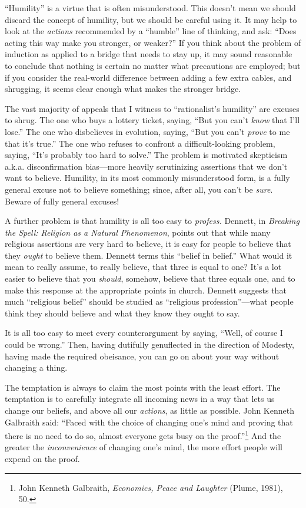 {
 ``Humility'' is a virtue that
is often misunderstood. This doesn't mean we should
discard the concept of humility, but we should be careful using it. It
may help to look at the \textit{actions} recommended by a
``humble'' line of thinking, and
ask: ``Does acting this way make you stronger, or
weaker?'' If you think about the problem of induction
as applied to a bridge that needs to stay up, it may sound reasonable
to conclude that nothing is certain no matter what precautions are
employed; but if you consider the real-world difference between adding
a few extra cables, and shrugging, it seems clear enough what makes the
stronger bridge.}

{
 The vast majority of appeals that I witness to
``rationalist's
humility'' are excuses to shrug. The one who buys a
lottery ticket, saying, ``But you
can't \textit{know} that I'll
lose.'' The one who disbelieves in evolution, saying,
``But you can't \textit{prove} to me
that it's true.'' The one who refuses
to confront a difficult-looking problem, saying,
``It's probably too hard to
solve.'' The problem is motivated skepticism a.k.a.
disconfirmation bias---more heavily scrutinizing assertions that we
don't want to believe. Humility, in its most commonly
misunderstood form, is a fully general excuse not to believe something;
since, after all, you can't be \textit{sure}. Beware of
fully general excuses!}

{
 A further problem is that humility is all too easy to
\textit{profess.} Dennett, in \textit{Breaking the Spell: Religion as a
Natural Phenomenon}, points out that while many religious assertions
are very hard to believe, it is easy for people to believe that they
\textit{ought} to believe them. Dennett terms this
``belief in belief.'' What would it
mean to really assume, to really believe, that three is equal to one?
It's a lot easier to believe that you \textit{should},
somehow, believe that three equals one, and to make this response at
the appropriate points in church. Dennett suggests that much
``religious belief'' should be
studied as ``religious
profession''---what people think they should believe
and what they know they ought to say.}

{
 It is all too easy to meet every counterargument by saying,
``Well, of course I could be
wrong.'' Then, having dutifully genuflected in the
direction of Modesty, having made the required obeisance, you can go on
about your way without changing a thing.}

{
 The temptation is always to claim the most points with the least
effort. The temptation is to carefully integrate all incoming news in a
way that lets us change our beliefs, and above all our
\textit{actions}, as little as possible. John Kenneth Galbraith said:
``Faced with the choice of changing
one's mind and proving that there is no need to do so,
almost everyone gets busy on the
proof.''\footnote{John Kenneth Galbraith, \textit{Economics, Peace and Laughter}
(Plume, 1981), 50.} And the greater the
\textit{inconvenience} of changing one's mind, the more
effort people will expend on the proof.}

